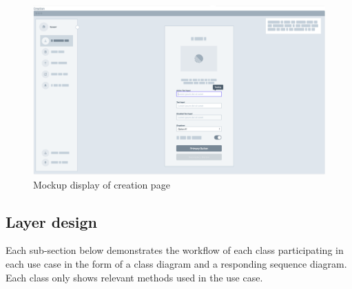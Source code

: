 \documentclass[../Main.tex]{subfiles}
\begin{document}
\begin{figure}[H]
    \centering
    \includegraphics[scale=0.3]{doc/imgs/mockup4.png}
    \caption{Mockup display of creation page}
    \label{fig:Mockup4}
\end{figure}

\subsection{Layer design}
Each sub-section below demonstrates the workflow of each class participating in each use case in the form of a class diagram and a responding sequence diagram. Each class only shows relevant methods used in the use case.
\end{document}
